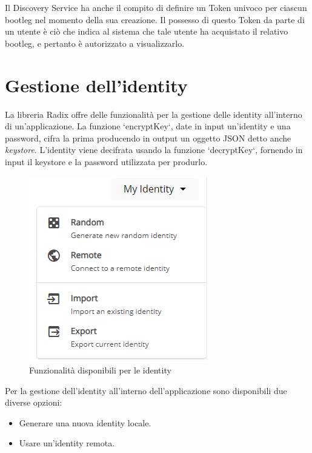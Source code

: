 Il Discovery Service ha anche il compito di definire un Token univoco per ciascun bootleg nel momento della sua creazione. Il possesso di questo Token da parte di un utente è ciò che indica al sistema che tale utente ha acquistato il relativo bootleg, e pertanto è autorizzato a visualizzarlo.

\section{Gestione dell'identity}

La libreria Radix offre delle funzionalità per la gestione delle identity all'interno di un'applicazione. La funzione `encryptKey`, date in input un'identity e una password, cifra la prima producendo in output un oggetto JSON detto anche \textit{keystore}. L'identity viene decifrata usando la funzione `decryptKey`, fornendo in input il keystore e la password utilizzata per produrlo.

\begin{figure}[H]
    \centering
    \includegraphics{images/application/identity-manage.png}
    \caption{Funzionalità disponibili per le identity}
    \label{fig:identity_manage}
\end{figure}

Per la gestione dell'identity all'interno dell'applicazione sono disponibili due diverse opzioni:
\begin{itemize}
    \item Generare una nuova identity locale.
    \item Usare un'identity remota.
\end{itemize}

